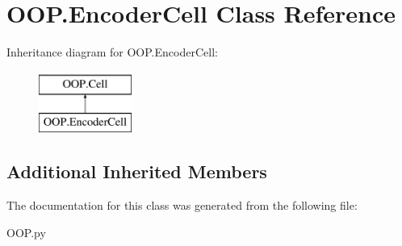 \hypertarget{class_o_o_p_1_1_encoder_cell}{}\section{O\+O\+P.\+Encoder\+Cell Class Reference}
\label{class_o_o_p_1_1_encoder_cell}
Inheritance diagram for O\+O\+P.\+Encoder\+Cell\+:\begin{figure}[H]
\begin{center}
\leavevmode
\includegraphics[height=2.000000cm]{class_o_o_p_1_1_encoder_cell}
\end{center}
\end{figure}
\subsection*{Additional Inherited Members}


The documentation for this class was generated from the following file\+:\begin{DoxyCompactItemize}
\item 
O\+O\+P.\+py\end{DoxyCompactItemize}
